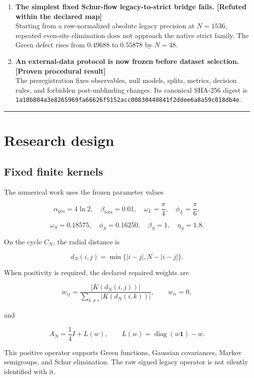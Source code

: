 \documentclass[11pt,a4paper,openany]{report}
\begin{document}
\begin{enumerate}
\item 
\textbf{The simplest fixed Schur-flow legacy-to-strict bridge fails. [Refuted within the declared map]}\\
Starting from a row-normalized absolute legacy precision at \(N=1536\), repeated even-site elimination does not approach the native strict family. The Green defect rises from \(0.49688\) to \(0.55878\) by \(N=48\).

\item 
\textbf{An external-data protocol is now frozen before dataset selection. [Proven procedural result]}\\
The preregistration fixes observables, null models, splits, metrics, decision rules, and forbidden post-unblinding changes. Its canonical SHA-256 digest is \texttt{1a10b804a3e82659}\allowbreak\texttt{69fa66626f5152ac}\allowbreak\texttt{c00830440841f2dd}\allowbreak\texttt{ee6a8a59c018db4e}.

\end{enumerate}

\par\medskip\hrule\medskip

\chapter{Research design}

\section{Fixed finite kernels}

The numerical work uses the frozen parameter values

\[
\alpha_{\mathrm{geo}}=4\ln2,\quad
\beta_{\mathrm{tors}}=0.01,\quad
\omega_L=\frac{\pi}{4},\quad
\phi_L=\frac{\pi}{6},
\]

\[
\omega_S=0.18575,\quad
\phi_S=0.16250,\quad
\beta_S=1,\quad
\eta_S=1.8.
\]

On the cycle \(C_N\), the radial distance is

\[
d_N(i,j)=\min\{|i-j|,N-|i-j|\}.
\]

When positivity is required, the declared repaired weights are

\[
w_{ij}
=
\frac{|K(d_N(i,j))|}
{\sum_{k\ne i}|K(d_N(i,k))|},
\qquad
w_{ii}=0,
\]

and

\[
A_N=\frac14I+L(w),
\qquad
L(w)=\operatorname{diag}(w\mathbf1)-w.
\]

This positive operator supports Green functions, Gaussian covariances, Markov semigroups, and Schur elimination. The raw signed legacy operator is not silently identified with it.
\end{document}
